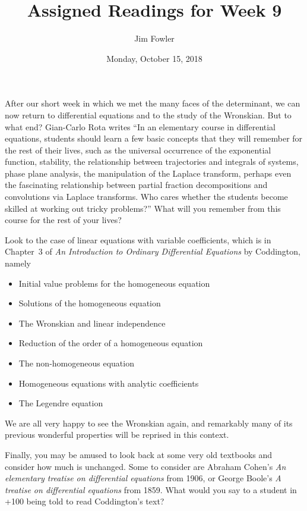 \documentclass{homework}
\author{Jim Fowler}
\title{Assigned Readings for Week 9}
\date{Monday, October 15, 2018}
\begin{document}
\maketitle

After our short week in which we met the many faces of the
determinant, we can now return to differential equations and to the
study of the Wronskian.  But to what end?  Gian-Carlo Rota writes ``In
an elementary course in differential equations, students should learn
a few basic concepts that they will remember for the rest of their
lives, such as the universal occurrence of the exponential function,
stability, the relationship between trajectories and integrals of
systems, phase plane analysis, the manipulation of the Laplace
transform, perhaps even the fascinating relationship between partial
fraction decompositions and convolutions via Laplace transforms.  Who
cares whether the students become skilled at working out tricky
problems?''  What will you remember from this course for the rest of
your lives?

Look to the case of linear equations with variable coefficients, which
is in Chapter~3 of \textit{An Introduction to Ordinary Differential
  Equations} by Coddington, namely
\begin{itemize}
\item {} Initial value problems for the homogeneous equation
\item {} Solutions of the homogeneous equation %
\item {} The Wronskian and linear independence %
\item {} Reduction of the order of a homogeneous equation %
\item {} The non-homogeneous equation %
\item {} Homogeneous equations with analytic coefficients %
\item {} The Legendre equation %
\end{itemize}
We are all very happy to see the Wronskian again, and remarkably many
of its previous wonderful properties will be reprised in this context.

Finally, you may be amused to look back at some very old textbooks and
consider how much is unchanged.  Some to consider are Abraham Cohen's
\textit{An elementary treatise on differential equations} from 1906,
or George Boole's \textit{A treatise on differential equations} from
1859.  What would you say to a student in \the\numexpr\year+100\relax{} being told to read
Coddington's text?
\end{document}

